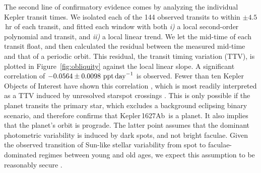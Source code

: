 \documentclass[12pt,modern,twocolumn,tighten]{aastex63}
\newcommand{\pn}{Kepler\,1627Ab} %
\begin{document}

The second line of confirmatory evidence comes by analyzing the
individual Kepler transit times. We isolated each of the 144 observed
transits to within $\pm4.5$\,hr of each transit, and fitted each
window with both {\it i)} a local second-order polynomial and transit,
and {\it ii)} a local linear trend.  We let the mid-time of each
transit float, and then calculated the residual between the measured
mid-time and that of a periodic orbit.  This residual, the transit
timing variation (TTV), is plotted in Figure~\ref{fig:obliquity}
against the local linear slope.  A significant correlation of $-0.0564
\pm 0.0098\ {\rm ppt\,day}^{-1}$ is observed.  Fewer than ten Kepler
Objects of Interest have shown this correlation
\citep{holczer_time_2015}, which is most readily interpreted as a TTV
induced by unresolved starspot crossings \citep{mazeh_time_2015}.
This is only possible if the planet transits the primary star, which
excludes a background eclipsing binary scenario, and therefore
confirms that \pn\ is a planet.  It also implies that the planet's
orbit is prograde.  The latter point assumes that the dominant
photometric variability is induced by dark spots, and not bright
faculae.  Given the observed transition of Sun-like stellar
variability from spot to faculae-dominated regimes between young and
old ages, we expect this assumption to be reasonably secure
\citep{shapiro_are_2016,montet_long-term_2017,reinhold_stellar_2020}.
\end{document}
